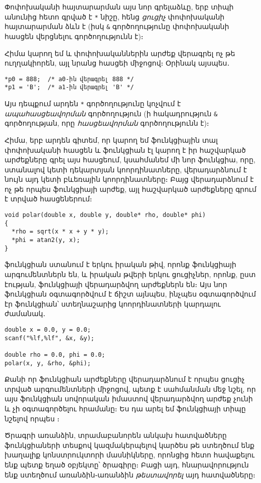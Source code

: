 Փոփոխականի հայտարարման այս նոր գրելաձևը, երբ տիպի անունից հետո գրված
է \verb|*| նիշը, հենց \emph{ցուցիչ} փոփոխականի հայտարարման ձևն է (իսկ
\verb|&| գործողությունը փոփոխականի հասցեն վերցնելու գործողությունն է)։

Հիմա կարող եմ  և  փոփոխականներին արժեք վերագրել ոչ թե
ուղղակիորեն, այլ նրանց հասցեի միջոցով։ Օրինակ այսպես․

\begin{Verbatim}
*p0 = 888;  /* a0-ին վերագրել 888 */
*p1 = 'B';  /* a1-ին վերագրել 'B' */
\end{Verbatim}

Այս դեպքում արդեն \verb|*| գործողությունը կոչվում է \emph{ապահասցեավորման}
գործողություն (ի հակադրություն \verb|&| գործողության, որը \emph{հասցեավորման}
գործողությունն է)։

Հիմա, երբ արդեն գիտեմ, որ կարող եմ ֆունկցիային տալ փոփոխականի հասցեն և
ֆունկցիան էլ կարող է իր հաշվարկած արժեքները գրել այս հասցեում, կսահմանեմ
մի նոր ֆունկցիա, որը, ստանալով կետի դեկարտյան կոորդինատները, վերադարձնում
է նույն այդ կետի բևեռային կոորդինատները։ Բայց վերադարձնում է ոչ թե որպես
ֆունկցիայի արժեք, այլ հաշվարկած արժեքները գրում է տրված հասցեներում։

\begin{Verbatim}
void polar(double x, double y, double* rho, double* phi)
{
  *rho = sqrt(x * x + y * y);
  *phi = atan2(y, x);
}
\end{Verbatim}

 ֆունկցիան ստանում է երկու իրական թիվ, որոնք ֆունկցիայի
արգումենտներն են, և իրական թվերի երկու ցուցիչներ, որոնք, ըստ էության,
ֆունկցիայի վերադարձվող արժեքներն են։ Այս նոր ֆունկցիան օգտագործվում է
ճիշտ այնպես, ինչպես օգտագործվում էր  ֆունկցիան՝ ստեղնաշարից
կոորդինատների կարդալու ժամանակ․

\begin{Verbatim}
double x = 0.0, y = 0.0;
scanf("%lf,%lf", &x, &y);

double rho = 0.0, phi = 0.0;
polar(x, y, &rho, &phi);
\end{Verbatim}

Քանի որ  ֆունկցիան արժեքները վերադարձնում է որպես ցուցիչ
տրված արգումենտների միջոցով, պետք է սահմանման մեջ նշել, որ այս ֆունկցիան
սովորական իմաստով վերադարձվող արժեք չունի և չի օգտագործելու 
հրամանը։ Ես դա արել եմ ֆունկցիայի տիպը նշելով որպես ։


Ծրագրի առանձին, տրամաբանորեն անկախ հատվածները ֆունկցիաների տեսքով
կազմակերպելով կարծես թե ստեղծում ենք խաղալիք կոնստրուկտորի մասնիկները,
որոնցից հետո հավաքելու ենք պետք եղած օբյեկտը՝ ծրագիրը։ Բացի այդ,
հնարավորություն ենք ստեղծում առանձին֊առանձին \emph{թեստավորել} այդ
հատվածները։

